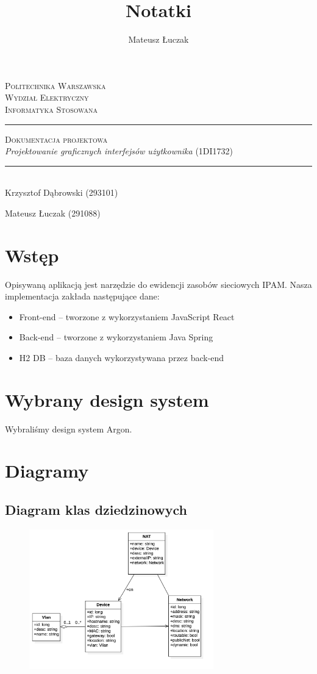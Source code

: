 \documentclass[a4paper,11pt]{article}
\title{Notatki}
\author{Mateusz Łuczak}
\date{}
\begin{document}
\thispagestyle{empty}
\begin{center}
	\textsc{\LARGE Politechnika Warszawska}\\[1.5cm]

	\textsc{\Large Wydział Elektryczny}\\[0.5cm]

	\textsc{\large Informatyka Stosowana}\\[2cm]

	\rule{\linewidth}{0.5mm}

	\textsc{\Large Dokumentacja projektowa}\\[0.5cm]

	\textit{Projektowanie graficznych interfejsów użytkownika} (1DI1732)

	\rule{\linewidth}{0.5mm}\\[3cm]

	\normalsize
	Krzysztof Dąbrowski (293101)

	Mateusz Łuczak (291088)
\end{center}

\newpage
\tableofcontents
{}
\newpage

\section{Wstęp}
Opisywaną aplikacją jest narzędzie do ewidencji zasobów sieciowych IPAM. Nasza implementacja zakłada następujące dane:
\begin{itemize}
	\item Front-end -- tworzone z wykorzystaniem JavaScript React
	\item Back-end -- tworzone z wykorzystaniem Java Spring
	\item H2 DB -- baza danych wykorzystywana przez back-end
\end{itemize}

\section{Wybrany design system}
Wybraliśmy design system Argon.

\section{Diagramy}
\subsection{Diagram klas dziedzinowych}
\begin{figure}[H]
	\includegraphics[width=8cm]{BuissnessClasses}
	\centering
\end{figure}
\end{document}
